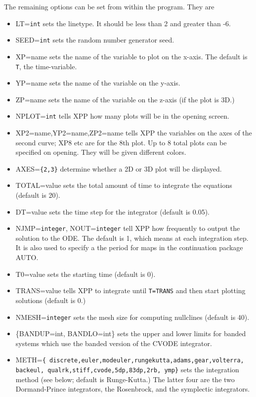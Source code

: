\documentclass{article}
\begin{document}
The remaining options can be set from within the program. They are
\begin{itemize}
\item LT={\tt int} sets the linetype. It should be less than 2 and
greater than -6.
\item SEED={\tt int} sets the random number generator seed.
 \item XP=name sets the name of the variable to plot on the x-axis.
The default is {\tt T}, the time-variable.
\item YP=name sets the name of the variable on the y-axis.
\item ZP=name sets the name of the variable on the z-axis (if the plot
is 3D.)
\item NPLOT={\tt int} tells XPP how many plots will be in the opening
screen.
\item XP2=name,YP2=name,ZP2=name tells XPP the variables on the axes
of the second curve; XP8 etc are for the 8th plot. Up to 8 total plots
can be specified on opening. They will be given different colors.
\item AXES={\tt \{2,3\}} determine whether a 2D or 3D plot will be
displayed.
\item TOTAL=value sets the total amount of time to integrate the
equations (default is 20).
\item DT=value sets the time step for the integrator (default is 0.05).
\item NJMP={\tt integer}, NOUT={\tt integer}
 tell XPP how frequently to output the
solution to the ODE.  The default is 1, which means at each
integration step. It is also used to specify a the period for maps in
the continuation package AUTO.
\item T0=value sets the starting time (default is 0).
\item TRANS=value tells XPP to integrate until {\tt T=TRANS} and then
start plotting solutions (default is 0.)
\item NMESH={\tt integer} sets the mesh size for computing nullclines
(default is 40).
\item \{BANDUP=int, BANDLO=int\} sets the upper and lower limits for
banded systems which use the banded version of the CVODE integrator.
\item METH={\tt \{
discrete,euler,modeuler,rungekutta,adams,gear,volterra, backeul,
qualrk,stiff,cvode,5dp,83dp,2rb, ymp\}}
sets the integration method (see below; default is Runge-Kutta.) The
latter four are the two Dormand-Prince integrators, the Rosenbrock,
and the symplectic integrators.

\end{itemize}
\end{document}

